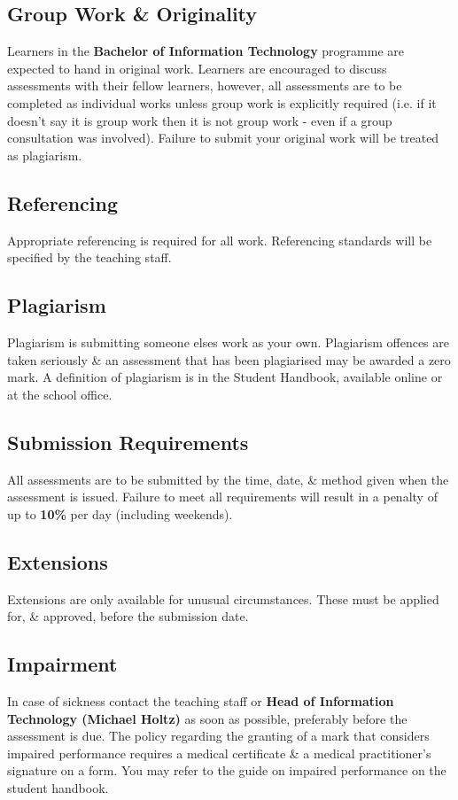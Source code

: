 \documentclass{article}
\begin{document}
\subsection*{Group Work \& Originality}
Learners in the \textbf{Bachelor of Information Technology} programme are expected to hand in original work. Learners are encouraged to discuss assessments with their fellow learners, however, all assessments are to be completed as individual works unless group work is explicitly required (i.e. if it doesn't say it is group work then it is not group work - even if a group consultation was involved). Failure to submit your original work will be treated as plagiarism.

\subsection*{Referencing}
Appropriate referencing is required for all work. Referencing standards will be specified by the teaching staff.

\subsection*{Plagiarism}
Plagiarism is submitting someone elses work as your own. Plagiarism offences are taken seriously \& an assessment that has been plagiarised may be awarded a zero mark. A definition of plagiarism is in the Student Handbook, available online or at the school office.

\subsection*{Submission Requirements}
All assessments are to be submitted by the time, date, \& method given when the assessment is issued. Failure to meet all requirements will result in a penalty of up to \textbf{10\%} per day (including weekends).

\subsection*{Extensions}
Extensions are only available for unusual circumstances. These must be applied for, \& approved, before the submission date.

\subsection*{Impairment}
In case of sickness contact the teaching staff or \textbf{Head of Information Technology (Michael Holtz)} as soon as possible, preferably before the assessment is due. The policy regarding the granting of a mark that considers impaired performance requires a medical certificate \& a medical practitioner’s signature on a form. You may refer to the guide on impaired performance on the student handbook. 
\end{document}
